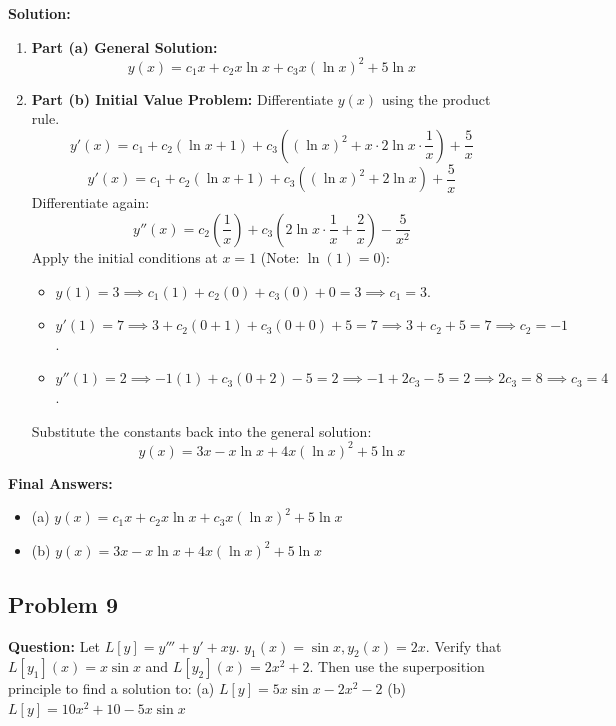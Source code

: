 \documentclass[11pt, a4paper]{article}
\theoremstyle{definition}
\theoremstyle{remark}
\begin{document}
\textbf{Solution:}
\begin{enumerate}
    \item \textbf{Part (a) General Solution:}
    \[ y(x) = c_1 x + c_2 x\ln x + c_3 x(\ln x)^2 + 5\ln x \]
    \item \textbf{Part (b) Initial Value Problem:} Differentiate $y(x)$ using the product rule.
    \[ y'(x) = c_1 + c_2(\ln x + 1) + c_3\left((\ln x)^2 + x \cdot 2\ln x \cdot \frac{1}{x}\right) + \frac{5}{x} \]
    \[ y'(x) = c_1 + c_2(\ln x + 1) + c_3((\ln x)^2 + 2\ln x) + \frac{5}{x} \]
    Differentiate again:
    \[ y''(x) = c_2\left(\frac{1}{x}\right) + c_3\left(2\ln x \cdot \frac{1}{x} + \frac{2}{x}\right) - \frac{5}{x^2} \]
    Apply the initial conditions at $x=1$ (Note: $\ln(1) = 0$):
    \begin{itemize}
        \item $y(1) = 3 \implies c_1(1) + c_2(0) + c_3(0) + 0 = 3 \implies c_1 = 3$.
        \item $y'(1) = 7 \implies 3 + c_2(0 + 1) + c_3(0 + 0) + 5 = 7 \implies 3 + c_2 + 5 = 7 \implies c_2 = -1$.
        \item $y''(1) = 2 \implies -1(1) + c_3(0 + 2) - 5 = 2 \implies -1 + 2c_3 - 5 = 2 \implies 2c_3 = 8 \implies c_3 = 4$.
    \end{itemize}
    Substitute the constants back into the general solution:
    \[ y(x) = 3x - x\ln x + 4x(\ln x)^2 + 5\ln x \]
\end{enumerate}
\textbf{Final Answers:}
\begin{itemize}
    \item (a) $y(x) = c_1 x + c_2 x\ln x + c_3 x(\ln x)^2 + 5\ln x$
    \item (b) $y(x) = 3x - x\ln x + 4x(\ln x)^2 + 5\ln x$
\end{itemize}

\vspace{1em}
\subsection{Problem 9}
\textbf{Question:} Let $L[y] = y''' + y' + xy$. $y_1(x) = \sin x, y_2(x) = 2x$. Verify that $L[y_1](x) = x\sin x$ and $L[y_2](x) = 2x^2 + 2$. Then use the superposition principle to find a solution to:
(a) $L[y] = 5x\sin x - 2x^2 - 2$
(b) $L[y] = 10x^2 + 10 - 5x\sin x$
\end{document}
